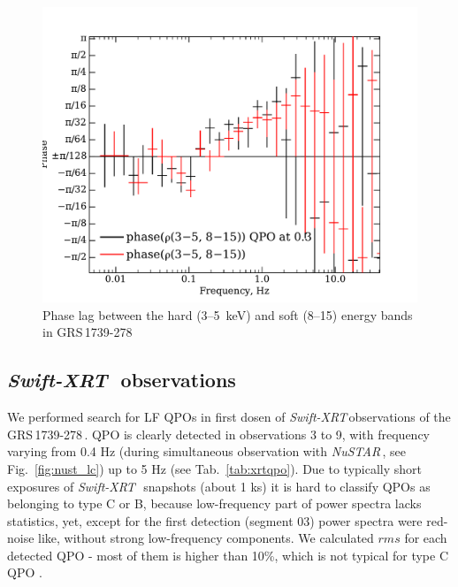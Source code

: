 \documentclass[a4paper,fleqn,usenatbib]{mnras}
\def\grs{{GRS\,1739-278\,}}
\def\swiftx{{\em Swift-XRT\,}}
\def\nustar{{\em NuSTAR\,}}
\begin{document}
{%

\begin{figure}
        \includegraphics[width=\columnwidth]{phase_lags_traced_and_not.pdf}
        \caption{Phase lag between the hard (3--5~keV) and soft (8--15) energy bands in \grs}
        \label{fig:phase_lag}
\end{figure}

\subsection{\swiftx\, observations}
We performed search for LF QPOs in first dosen of \swiftx observations of the \grs. QPO is clearly detected in observations 3 to 9, with frequency varying from 0.4 Hz (during simultaneous observation with \nustar, see Fig.~\ref{fig:nust_lc}) up to 5 Hz (see Tab.~\ref{tab:xrtqpo}). Due to typically short exposures of \swiftx\, snapshots (about 1 ks) it is hard to classify QPOs as belonging to type C or B, because low-frequency part of power spectra lacks statistics, yet, except for the first detection (segment 03) power spectra were red-noise like, without strong low-frequency components. We calculated $rms$ for each detected QPO - most of them is higher than 10\%, which is not typical for type C QPO \citep{casella05}.

}
\end{document}

